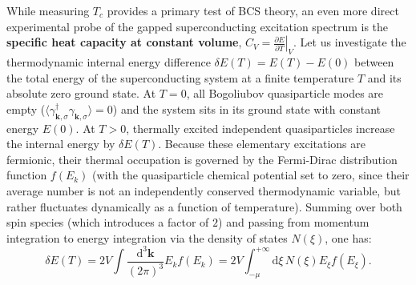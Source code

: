 While measuring \( T_c \) provides a primary test of BCS theory, an even more direct experimental probe of the gapped superconducting excitation spectrum is the \textbf{specific heat capacity at constant volume}, \( C_V = \left. \frac{\partial E}{\partial T} \right|_V \). Let us investigate the thermodynamic internal energy difference \( \delta E(T) = E(T) - E(0) \) between the total energy of the superconducting system at a finite temperature \( T \) and its absolute zero ground state. At \( T = 0 \), all Bogoliubov quasiparticle modes are empty (\( \langle \gamma_{\mathbf{k},\sigma}^\dagger \gamma_{\mathbf{k},\sigma} \rangle = 0 \)) and the system sits in its ground state with constant energy \( E(0) \). At \( T > 0 \), thermally excited independent quasiparticles increase the internal energy by \( \delta E(T) \). Because these elementary excitations are fermionic, their thermal occupation is governed by the Fermi-Dirac distribution function \( f(E_k) \) (with the quasiparticle chemical potential set to zero, since their average number is not an independently conserved thermodynamic variable, but rather fluctuates dynamically as a function of temperature). Summing over both spin species (which introduces a factor of \( 2 \)) and passing from momentum integration to energy integration via the density of states \( N(\xi) \), one has:
\[
    \delta E(T) = 2V \int \frac{\mathrm{d}^3\mathbf{k}}{(2\pi)^3} E_k f(E_k) = 2V \int_{-\mu}^{+\infty} \mathrm{d}\xi \, N(\xi) E_\xi f(E_\xi).
\]

